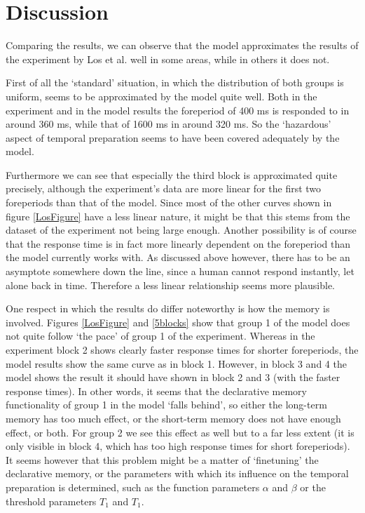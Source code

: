 \documentclass[10pt,letterpaper]{article}
\begin{document}
\section{Discussion}
Comparing the results, we can observe that the model approximates the results of the experiment by Los et al. well in some areas, while in others it does not.

First of all the `standard' situation, in which the distribution of both groups is uniform, seems to be approximated by the model quite well. Both in the experiment and in the model results the foreperiod of 400 ms is responded to in around 360 ms, while that of 1600 ms in around 320 ms. So the `hazardous' aspect of temporal preparation seems to have been covered adequately by the model.

Furthermore we can see that especially the third block is approximated quite precisely, although the experiment's data are more linear for the first two foreperiods than that of the model. Since most of the other curves shown in figure \ref{LosFigure} have a less linear nature, it might be that this stems from the dataset of the experiment not being large enough. Another possibility is of course that the response time is in fact more linearly dependent on the foreperiod than the model currently works with. As discussed above however, there has to be an asymptote somewhere down the line, since a human cannot respond instantly, let alone back in time. Therefore a less linear relationship seems more plausible. 

One respect in which the results do differ noteworthy is how the memory is involved. Figures \ref{LosFigure} and \ref{5blocks} show that group 1 of the model does not quite follow `the pace' of group 1 of the experiment. Whereas in the experiment block 2 shows clearly faster response times for shorter foreperiods, the model results show the same curve as in block 1. However, in block 3 and 4 the model shows the result it should have shown in block 2 and 3 (with the faster response times). In other words, it seems that the declarative memory functionality of group 1 in the model `falls behind', so either the long-term memory has too much effect, or the short-term memory does not have enough effect, or both. For group 2 we see this effect as well but to a far less extent (it is only visible in block 4, which has too high response times for short foreperiods). It seems however that this problem might be a matter of `finetuning' the declarative memory, or the parameters with which its influence on the temporal preparation is determined, such as the function parameters $\alpha$ and $\beta$ or the threshold parameters $T_1$ and $T_1$.
\end{document}
